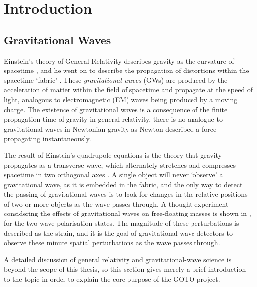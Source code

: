 \chapter{Introduction}
\label{chap:intro}
\chaptoc{}


\newpage
\section{Gravitational Waves}
\label{sec:gw}
\begin{colsection}


\begin{colsection}

Einstein's theory of General Relativity describes gravity as the curvature of spacetime \citep{Einstein1914}, and he went on to describe the propagation of distortions within the spacetime `fabric' \citep{Einstein1916}. These \emph{gravitational waves} (GWs)  are produced by the acceleration of matter within the field of spacetime and propagate at the speed of light, analogous to electromagnetic (EM)  waves being produced by a moving charge. The existence of gravitational waves is a consequence of the finite propagation time of gravity in general relativity, there is no analogue to gravitational waves in Newtonian gravity as Newton described a force propagating instantaneously.

The result of Einstein's quadrupole equations is the theory that gravity propagates as a transverse wave, which alternately stretches and compresses spacetime in two orthogonal axes \citep{BIGcardiff}. A single object will never `observe' a gravitational wave, as it is embedded in the fabric, and the only way to detect the passing of gravitational waves is to look for changes in the relative positions of two or more objects as the wave passes through. A thought experiment considering the effects of gravitational waves on free-floating masses is shown in , for the two wave polarisation states. The magnitude of these perturbations is described as the strain, and it is the goal of gravitational-wave detectors to observe these minute spatial perturbations as the wave passes through.

A detailed discussion of general relativity and gravitational-wave science is beyond the scope of this thesis, so this section gives merely a brief introduction to the topic in order to explain the core purpose of the GOTO project.


\end{colsection}
\end{colsection}
